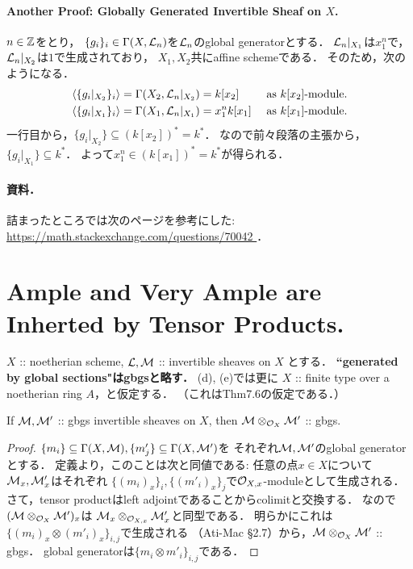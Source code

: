 \documentclass[a4paper]{jsarticle}
\begin{document}
    \paragraph{Another Proof: Globally Generated Invertible Sheaf on $X$.}
    $n \in \mathbb{Z}$をとり，
    $\{g_i\}_i \in \Gamma(X, \mathcal{L}_n)$を$\mathcal{L}_n$のglobal generatorとする．
    $\mathcal{L}_n|_{X_1}$は$x_1^n$で，$\mathcal{L}_n|_{X_2}$は$1$で生成されており，
    $X_1, X_2$共にaffine schemeである．
    そのため，次のようになる．
    \begin{align*}
        &\langle \{ g_i|_{X_2} \}_i \rangle
            =\Gamma(X_2, \mathcal{L}_n|_{X_2})
               =k[x_2]
                    &&\text{  as  $k[x_2]$-module.} \\
        &\langle \{ g_i|_{X_1} \}_i \rangle
            =\Gamma(X_1, \mathcal{L}_n|_{X_1})
                =x_1^n k[x_1]
                    &&\text{  as  $k[x_1]$-module.}
    \end{align*}
    一行目から，$\{g_i|_{X_2}\} \subseteq (k[x_2])^*=k^*$．
    なので前々段落の主張から，$\{g_i|_{X_1}\} \subseteq k^*$．
    よって$x_1^n \in (k[x_1])^*=k^*$が得られる．

    \paragraph{資料．}
    詰まったところでは次のページを参考にした:
    \url{ https://math.stackexchange.com/questions/70042 }．
          
\section{Ample and Very Ample are Inherted by Tensor Products.} %
    $X$ :: noetherian scheme,
    $\mathcal{L}, \mathcal{M}$ :: invertible sheaves on $X$
    とする．
    \textbf{``generated by global sections"はgbgsと略す．}
    (d), (e)では更に
    $X$ :: finite type over a noetherian ring $A$，と仮定する．
    （これはThm7.6の仮定である．）

    \begin{Lemma}
        If $\mathcal{M}, \mathcal{M}'$ :: gbgs invertible sheaves on $X$,
        then $\mathcal{M} \otimes_{\mathcal{O}_X} \mathcal{M}'$ :: gbgs.
    \end{Lemma}
    \begin{proof}
        $\{m_i\} \subseteq \Gamma(X, \mathcal{M}), \{m'_j\} \subseteq \Gamma(X, \mathcal{M}')$を
        それぞれ$\mathcal{M}, \mathcal{M}'$のglobal generatorとする．
        定義より，このことは次と同値である:
        任意の点$x \in X$について$\mathcal{M}_x, \mathcal{M}'_x$はそれぞれ
        $\{(m_i)_x\}_i, \{(m'_i)_x\}_j$で$\mathcal{O}_{X,x}$-moduleとして生成される．
        さて，tensor productはleft adjointであることからcolimitと交換する．
        なので$(\mathcal{M} \otimes_{\mathcal{O}_X} \mathcal{M}')_x$は
        $\mathcal{M}_x \otimes_{\mathcal{O}_{X,x}} \mathcal{M}'_x$と同型である．
        明らかにこれは$\{(m_i)_x \otimes (m'_i)_x\}_{i,j}$で生成される
        （Ati-Mac \S2.7）から，$\mathcal{M} \otimes_{\mathcal{O}_X} \mathcal{M}'$ :: gbgs．
        global generatorは$\{m_i \otimes m'_i\}_{i,j}$である．
    \end{proof}
\end{document}
